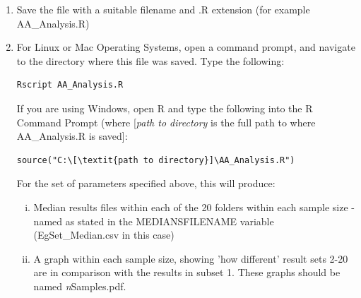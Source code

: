 \documentclass[a4paper,11pt]{article}
\begin{document}
\begin{enumerate}
This independently examines each sample size to be examined, and determines how 'different' the results of each of the 20 subsets are.  As a first step, the algorithm needs to go through each subset and create a set of medians which can then be compared with another of the 20 subsets. Therefore, the algorithm takes each of the 20 sets in turn, producing a file containing the median of each output measure for each simulation run in that set. This may be easier to understand with the use of an example. Lets say we are analysing the uncertainty in 5 simulation runs. So our sample size is 5.  For this sample size, we will have 20 sets of results, each containing 5 runs. The algorithm takes each of these 20 in turn, producing a file containing the median output for all measures for each of the 5 runs. (so, in our example, we have two output measures, Velocity and Displacement - a file would be created within each of the 20 sets containing the median Velocity and Displacement measures for each of the 5 runs).  Once this process has been completed, the median results for subsets 2-20 are compared with those in subset 1 using the Vargha-Delaney A-Test, with these results stored in an output file. This file is either in CSV or XML format, dependent on the file format set in the MEDIANSFILEFORMAT variable. The A-Test results are then graphed, showing how different each of the 20 subsets are. Thus, when this example is run, you will generate five graphs, one for each sample size.  The graph you should generate for a sample size of 5 (AA\_5Samples.pdf) is in Figure 2.

\item Save the file with a suitable filename and .R extension (for example AA\_Analysis.R)
\item For Linux or Mac Operating Systems, open a command prompt, and navigate to the directory where this file was saved.  Type the following:

\begin{verbatim}
Rscript AA_Analysis.R
\end{verbatim}

If you are using Windows, open R and type the following into the R Command Prompt (where [\textit{path to directory} is the full path to where AA\_Analysis.R is saved]:

\begin{verbatim}
source("C:\[\textit{path to directory}]\AA_Analysis.R")
\end{verbatim}

For the set of parameters specified above, this will produce:
\begin{enumerate}[(i)]
\item Median results files within each of the 20 folders within each sample size - named as stated in the MEDIANSFILENAME variable (EgSet\_Median.csv in this case)
\item A graph within each sample size, showing 'how different' result sets 2-20 are in comparison with the results in subset 1.  These graphs should be named \textit{n}Samples.pdf.
\end{enumerate}


\end{enumerate}
\end{document}

